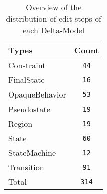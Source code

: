 \begin{table} 
 \center 
 \small 
\begin{tabular}{|l|c|}
\hline
Types & Count\\ 
  \hline 
Constraint & \texttt{44}\\ 
  \hline 
FinalState & \texttt{16}\\ 
  \hline 
OpaqueBehavior & \texttt{53}\\ 
  \hline 
Pseudostate & \texttt{19}\\ 
  \hline 
Region & \texttt{19}\\ 
  \hline 
State & \texttt{60}\\ 
  \hline 
StateMachine & \texttt{12}\\ 
  \hline 
Transition & \texttt{91}\\ 
  \hline 
Total & \texttt{314}\\ 
  \hline 
\end{tabular}
\caption[Overview: Delta-Models]{Overview of the distribution of edit steps of each Delta-Model}
\end{table}

